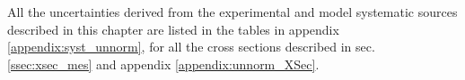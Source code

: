 

All the uncertainties derived from the experimental and model systematic sources described in this chapter are listed in the tables in appendix \ref{appendix:syst_unnorm},
for all the cross sections described in sec. \ref{ssec:xsec_mes} and appendix \ref{appendix:unnorm_XSec}. 
% 
% 

% 
% 
% 
% 
% 
% 
% 
% 
% 
% 
% 
% 
% 
% 
% 
% 
% 
% 
% 
% 
% 
% 
% 
% 
% 
% 
% 
% 
